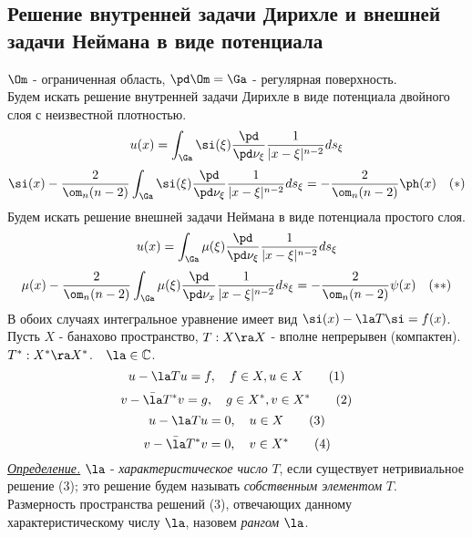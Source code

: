 \documentclass[a4paper,draft]{article}
\begin{document}
\subsection{Решение внутренней задачи Дирихле и внешней задачи Неймана в виде потенциала}
$\Om$ - ограниченная область, $\pd\Om=\Ga$ -
регулярная поверхность.\\
Будем искать решение внутренней задачи Дирихле в виде потенциала
двойного слоя с неизвестной плотностью.
$$
u(x)=\int_{\Ga}\si(\xi)\frac{\pd}{\pd\nu_{\xi}}\frac{1}{|x-\xi|^{n-2}}ds_{\xi}
$$
$$
\si(x)-\frac{2}{\om_n(n-2)}\int_{\Ga}\si(\xi)\frac{\pd}{\pd\nu_{\xi}}\frac{1}{|x-\xi|^{n-2}}ds_{\xi}=
-\frac{2}{\om_n(n-2)}\ph(x)\quad (*)
$$
Будем искать решение внешней задачи Неймана в виде потенциала
простого слоя.
$$
u(x)=\int_{\Ga}\mu(\xi)\frac{\pd}{\pd\nu_{\xi}}\frac{1}{|x-\xi|^{n-2}}ds_{\xi}
$$
$$
\mu(x)-\frac{2}{\om_n(n-2)}\int_{\Ga}\mu(\xi)\frac{\pd}{\pd\nu_x}\frac{1}{|x-\xi|^{n-2}}ds_{\xi}=
-\frac{2}{\om_n(n-2)}\psi(x)\quad(**)
$$
В обоих случаях интегральное уравнение имеет вид
$\si(x)-\la T\si=f(x)$.\\
Пусть $X$ - банахово пространство, $T:X\ra X$ - вполне непрерывен
(компактен).\\
$T^*:X^*\ra X^*$.$\quad\la\in\mathbb{C}$.
$$
u-\la Tu=f,\quad f\in X,u\in X\quad\quad (1)
$$
$$
v-\bar{\la} T^*v=g,\quad g\in X^*,v\in X^*\quad\quad (2)
$$
$$
u-\la Tu=0,\quad u\in X\quad\quad (3)
$$
$$
v-\bar{\la} T^*v=0,\quad v\in X^*\quad\quad (4)
$$
\textit{\underline{Определение.}} $\la$ -
\textit{характеристическое число} $T$, если существует
нетривиальное решение (3); это решение будем называть
\textit{собственным элементом} $T$. Размерность пространства
решений (3), отвечающих данному характеристическому числу
$\la$, назовем \textit{рангом} $\la$.
\end{document}
